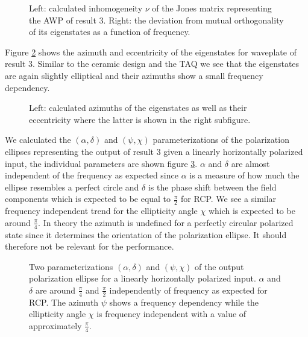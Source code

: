 \begin{figure}[H]
    \centering
    
    \caption{Left: calculated inhomogeneity $\nu$ of the Jones matrix representing the AWP of result 3. Right: the deviation from mutual orthogonality of its eigenstates as a function of frequency.}
    \label{fig:inhomogeneity_orthogonality}
\end{figure}

Figure \ref{fig:polymer_eigenstate_params} shows the azimuth and eccentricity of the eigenstates for waveplate of result 3. Similar to the ceramic design and the TAQ we see that the eigenstates are again slightly elliptical and their azimuths show a small frequency dependency.

\begin{figure}[H]
    \centering
    
    \caption{Left: calculated azimuths of the eigenstates as well as their eccentricity where the latter is shown in the right subfigure.}
    \label{fig:polymer_eigenstate_params}
\end{figure}

We calculated the $(\alpha, \delta)$ and $(\psi, \chi)$ parameterizations of the polarization ellipses representing the output of result 3 given a linearly horizontally polarized input, the individual parameters are shown figure \ref{fig:polymer_params_dotted}. $\alpha$ and $\delta$ are almost independent of the frequency as expected since $\alpha$ is a measure of how much the ellipse resembles a perfect circle and $\delta$ is the phase shift between the field components which is expected to be equal to $\frac{\pi}{2}$ for RCP. We see a similar frequency independent trend for the ellipticity angle $\chi$ which is expected to be around $\frac{\pi}{4}$. In theory the azimuth is undefined for a perfectly circular polarized state since it determines the orientation of the polarization ellipse. It should therefore not be relevant for the performance.

\begin{figure}[H]
    \centering
    
    \caption{Two parameterizations $(\alpha, \delta)$ and $(\psi, \chi)$ of the output polarization ellipse for a linearly horizontally polarized input. $\alpha$ and $\delta$ are around $\frac{\pi}{4}$ and $\frac{\pi}{2}$ independently of frequency as expected for RCP. The azimuth $\psi$ shows a frequency dependency while the ellipticity angle $\chi$ is frequency independent with a value of approximately $\frac{\pi}{4}$.}
    \label{fig:polymer_params_dotted}
\end{figure}

